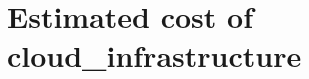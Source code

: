 

\chapter{Estimated cost of \texorpdfstring{\gls{cloud_infrastructure}}{}} \label{annexe_cloud_cost}

